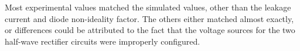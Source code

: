 \documentclass[11pt]{article}
\begin{document}
	\hfill \break

	Most experimental values matched the simulated values, other than 
	the leakage current and diode non-ideality factor. The others either
	matched almost exactly, or differences could be attributed to the fact
	that the voltage sources for the two half-wave rectifier circuits were
	improperly configured.
\end{document}
